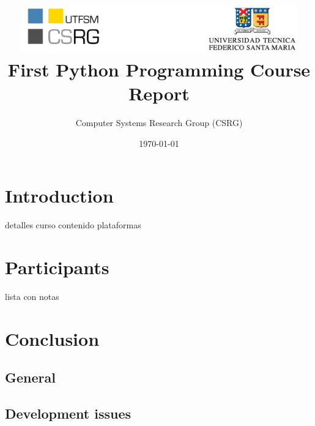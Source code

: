 \documentclass[letter, 10pt]{article}
\begin{document}
\title{\includegraphics[width=0.9\textwidth]{img/logos.pdf}\\\vspace{1cm}
First Python Programming Course Report}
\author{Computer Systems Research Group (CSRG)}
\date{\today}

\maketitle

\section{Introduction}
    detalles curso
    contenido
    plataformas
\section{Participants} 
    lista con notas
\section{Conclusion}
\subsection{General}
\subsection{Development issues}
\end{document}
